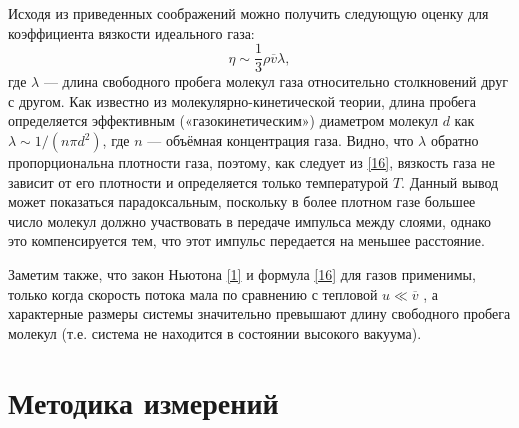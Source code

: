 \documentclass[a4paper, 12pt]{article}
\begin{document}
\par Исходя из приведенных соображений можно получить следующую
оценку для коэффициента вязкости идеального газа:
\begin{equation}\label{16}
\eta \sim \frac{1}{3}\rho \overline{v} \lambda,
\end{equation}
где $\lambda$ — длина свободного пробега молекул газа относительно столкновений
друг с другом. Как известно из молекулярно-кинетической теории, длина пробега определяется эффективным («газокинетическим») диаметром молекул $d$
как $\lambda \sim 1/(n\pi d^2)$, где $n$ — объёмная концентрация газа. Видно, что $\lambda$ обратно пропорциональна плотности газа, поэтому, как следует из \eqref{16}, вязкость газа не зависит от его плотности и определяется только температурой $T$. Данный вывод может показаться парадоксальным, поскольку в более плотном газе большее число молекул должно участвовать в передаче импульса между слоями, однако это компенсируется тем, что этот импульс передается на меньшее
расстояние.
\par Заметим также, что закон Ньютона \eqref{1} и формула \eqref{16} для газов применимы, только когда скорость потока мала по сравнению с тепловой $u \ll \overline{v}$ , а характерные размеры системы значительно превышают длину свободного пробега молекул (т.е. система не находится в состоянии высокого вакуума).
\section{Методика измерений}
\end{document}
